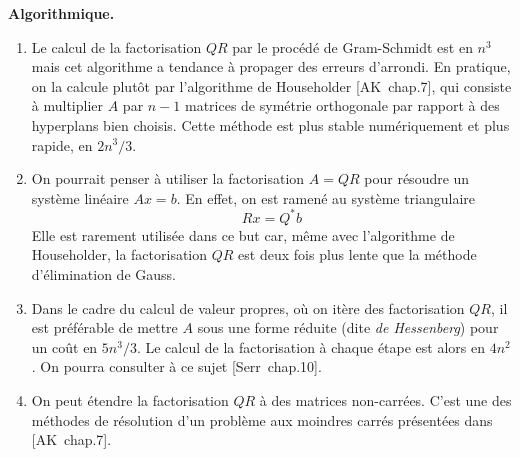 {\bf Algorithmique.}
\begin{enumerate}
\item Le calcul de la factorisation $QR$ par le procédé de Gram-Schmidt est
	en $n^3$ mais cet algorithme a tendance à propager des erreurs d'arrondi.
	En pratique, on la calcule plutôt par l'algorithme de Householder
	[AK~chap.7], qui consiste à multiplier $A$ par $n-1$ matrices de symétrie
	orthogonale par rapport à des hyperplans bien choisis. Cette méthode est
	plus stable numériquement et plus rapide, en $2n^3/3$.
\item On pourrait penser à utiliser la factorisation $A = QR$ pour résoudre
	un système linéaire $Ax = b$. En effet, on est ramené au système
	triangulaire
\[
Rx = Q^* b
\]
Elle est rarement utilisée dans ce but car, même avec l'algorithme de
Householder, la factorisation $QR$ est deux fois plus lente que la méthode
d'élimination de Gauss.
\item
	Dans le cadre du calcul de valeur propres, où on itère des
	factorisation $QR$, il est préférable de mettre $A$ sous une forme réduite
	(dite \emph{de Hessenberg}) pour un coût en $5n^3/3$. Le calcul de la
	factorisation à chaque étape est alors en $4n^2$. On pourra consulter à ce
	sujet [Serr~chap.10].
\item On peut étendre la factorisation $QR$ à des matrices non-carrées. C'est
	une des méthodes de résolution d'un problème aux moindres carrés présentées
	dans [AK~chap.7].
\end{enumerate}

%
%
%
%
%
%
%


